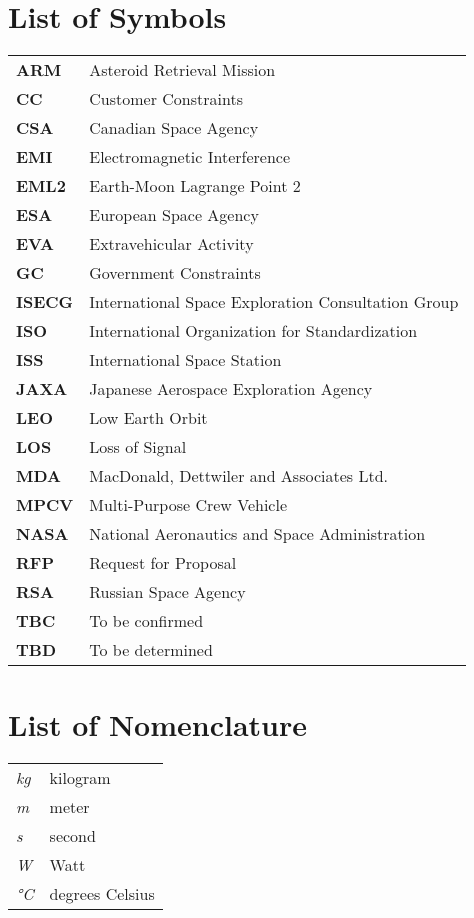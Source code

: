

\section*{List of Symbols}

\normalsize
\begin{tabular}{ll}
\textbf{ARM}	&	Asteroid Retrieval Mission	\\
\textbf{CC}	&	Customer Constraints	\\
\textbf{CSA}	&	Canadian Space Agency	\\
\textbf{EMI}	&	Electromagnetic Interference	\\
\textbf{EML2}	&	Earth-Moon Lagrange Point 2	\\
\textbf{ESA}	&	European Space Agency	\\
\textbf{EVA}	&	Extravehicular Activity	\\
\textbf{GC}	&	Government Constraints	\\
\textbf{ISECG}	&	International Space Exploration Consultation Group	\\
\textbf{ISO}	&	International Organization for Standardization	\\
\textbf{ISS}	&	International Space Station	\\
\textbf{JAXA}	&	Japanese Aerospace Exploration Agency	\\
\textbf{LEO}	&	Low Earth Orbit	\\
\textbf{LOS}	&	Loss of Signal	\\
\textbf{MDA}	&	MacDonald, Dettwiler and Associates Ltd.	\\
\textbf{MPCV}	&	Multi-Purpose Crew Vehicle	\\
\textbf{NASA}	&	National Aeronautics and Space Administration	\\
\textbf{RFP}	&	Request for Proposal	\\
\textbf{RSA}	&	Russian Space Agency	\\
\textbf{TBC}	&	To be confirmed	\\
\textbf{TBD}	&	To be determined	\\

\end{tabular}

\section*{List of Nomenclature}

\normalsize
\begin{tabular}{ll}
\textit{kg}	&	kilogram	\\
\textit{m}	&	meter	\\
\textit{s}	&	second	\\
\textit{W}	&	Watt		\\
\textit{\si{\celsius}}	&	degrees Celsius	\\

\end{tabular}

\vspace*{\fill}

